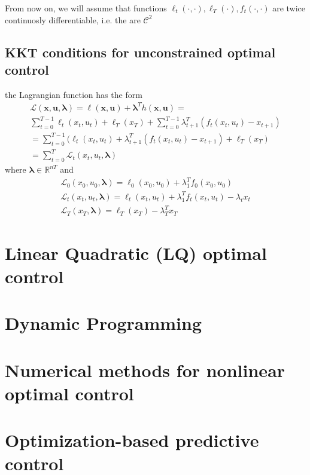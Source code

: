 \documentclass{book}
\newcommand{\R}{\mathbb{R}}
\theoremstyle{definition}
\theoremstyle{remark}
\theoremstyle{remark}
\begin{document}
From now on, we will assume that functions $\ell_t(\cdot,\cdot),\ell_T(\cdot),f_t(\cdot,\cdot)$ are twice continuosly differentiable, i.e. the are $\mathcal{C}^2$
%
\section{KKT conditions for unconstrained optimal control}
the Lagrangian function has the form 
\begin{multline*}
    \mathcal{L}(\mathbf{x,u,\lambda}) = \ell(\mathbf{x,u})+\mathbf{\lambda}^Th(\mathbf{x,u}) = \\
    \displaystyle\sum_{t=0}^{T-1}\ell_t(x_t,u_t)+\ell_T(x_T) + \displaystyle\sum_{t=0}^{T-1}\lambda^T_{t+1}(f_t(x_t,u_t)-x_{t+1}) \\
    = \displaystyle\sum_{t=0}^{T-1}(\ell_t(x_t,u_t)+\lambda^T_{t+1}(f_t(x_t,u_t)-x_{t+1})+\ell_T(x_T) \\
    =\displaystyle\sum_{t=0}^{T}\mathcal{L}_t(x_t,u_t,\mathbf{\lambda})
\end{multline*}
where $\mathbf{\lambda}\in\R^{nT}$ and 
\begin{gather*}
    \mathcal{L}_0(x_0,u_0,\mathbf{\lambda}) = \ell_0(x_0,u_0)+\lambda_1^T f_0(x_0,u_0)\\
    \mathcal{L}_t(x_t,u_t,\mathbf{\lambda}) = \ell_t(x_t,u_t)+\lambda_1^T f_t(x_t,u_t)-\lambda_tx_t\\
    \mathcal{L}_T(x_T,\mathbf{\lambda}) = \ell_T(x_T) - \lambda_T^Tx_T
\end{gather*}

































\chapter{Linear Quadratic (LQ) optimal control}


\chapter{Dynamic Programming}



\chapter{Numerical methods for nonlinear optimal control}




\chapter{Optimization-based predictive control}
\end{document}
